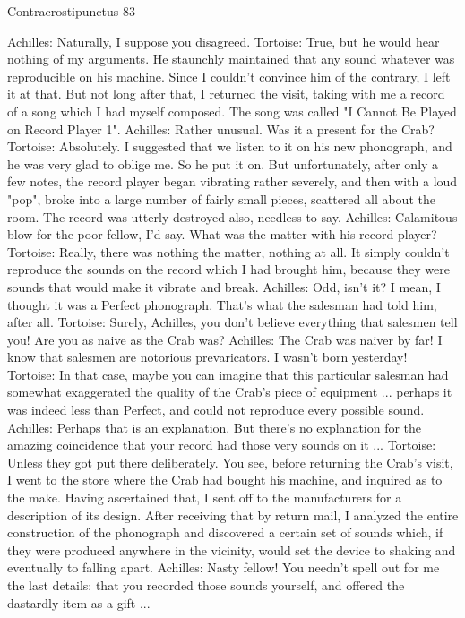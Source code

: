 Contracrostipunctus                                                                      83

Achilles: Naturally, I suppose you disagreed.
Tortoise: True, but he would hear nothing of my arguments. He staunchly maintained that
       any sound whatever was reproducible on his machine. Since I couldn't convince
       him of the contrary, I left it at that. But not long after that, I returned the visit,
       taking with me a record of a song which I had myself composed. The song was
       called "I Cannot Be Played on Record Player 1".
Achilles: Rather unusual. Was it a present for the Crab?
Tortoise: Absolutely. I suggested that we listen to it on his new phonograph, and he was
       very glad to oblige me. So he put it on. But unfortunately, after only a few notes,
       the record player began vibrating rather severely, and then with a loud "pop",
       broke into a large number of fairly small pieces, scattered all about the room. The
       record was utterly destroyed also, needless to say.
Achilles: Calamitous blow for the poor fellow, I'd say. What was the matter with his
       record player?
Tortoise: Really, there was nothing the matter, nothing at all. It simply couldn't reproduce
       the sounds on the record which I had brought him, because they were sounds that
       would make it vibrate and break.
Achilles: Odd, isn't it? I mean, I thought it was a Perfect phonograph. That's what the
       salesman had told him, after all.
Tortoise: Surely, Achilles, you don't believe everything that salesmen tell you! Are you
       as naive as the Crab was?
Achilles: The Crab was naiver by far! I know that salesmen are notorious prevaricators. I
       wasn't born yesterday!
Tortoise: In that case, maybe you can imagine that this particular salesman had somewhat
       exaggerated the quality of the Crab's piece of equipment ... perhaps it was indeed
       less than Perfect, and could not reproduce every possible sound.
Achilles: Perhaps that is an explanation. But there's no explanation for the amazing
       coincidence that your record had those very sounds on it ...
Tortoise: Unless they got put there deliberately. You see, before returning the Crab's
       visit, I went to the store where the Crab had bought his machine, and inquired as
       to the make. Having ascertained that, I sent off to the manufacturers for a
       description of its design. After receiving that by return mail, I analyzed the entire
       construction of the phonograph and discovered a certain set of sounds which, if
       they were produced anywhere in the vicinity, would set the device to shaking and
       eventually to falling apart.
Achilles: Nasty fellow! You needn't spell out for me the last details: that you recorded
       those sounds yourself, and offered the dastardly item as a gift ...




